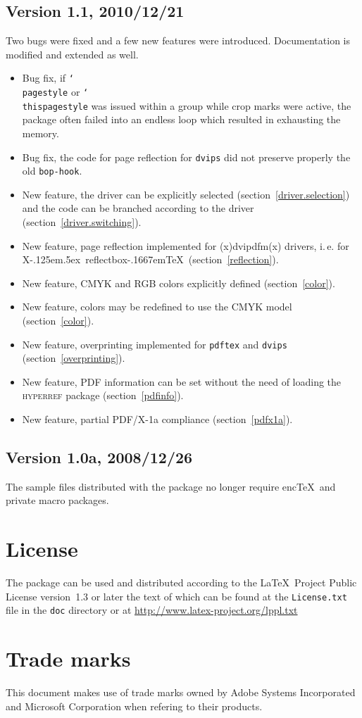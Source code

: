 \documentclass[11pt]{article}
\makeatletter
\let\pkg\textsc
\DeclareRobustCommand\cmd[1]{\texttt{\char`\\#1}}
\def\ie.{i.\,e.\@}
\DeclareRobustCommand\XeTeX{X\kern-.125em\lower.5ex\hbox{\csname
              reflectbox\endcsname{E}}\kern-.1667em\TeX}
\let\zwcomma\,
\def\,{\texorpdfstring{\zwcomma}{}}
\makeatother
\begin{document}
\subsection{Version 1.1, 2010/12/21}
Two bugs were fixed and a few new features were introduced. Documentation is modified and extended as
well.
\begin{itemize}
\item Bug fix, if \cmd{pagestyle} or \cmd{thispagestyle} was issued within a group while crop marks
were active, the package often failed into an endless loop which resulted in exhausting the memory.
\item Bug fix, the code for page reflection for \texttt{dvips} did not preserve properly the old
\texttt{bop-hook}.
\item New feature, the driver can be explicitly selected (section~\ref{driver.selection}) and the
code can be branched according to the driver (section~\ref{driver.switching}).
\item New feature, page reflection implemented for (x)dvipdfm(x) drivers, \ie. for \XeTeX\
(section~\ref{reflection}).
\item New feature, CMYK and RGB colors explicitly defined (section~\ref{color}).
\item New feature, colors may be redefined to use the CMYK model (section~\ref{color}).
\item New feature, overprinting implemented for \texttt{pdftex} and \texttt{dvips}
(section~\ref{overprinting}).
\item New feature, PDF information can be set without the need of loading the \pkg{hyperref}
package (section~\ref{pdfinfo}).
\item New feature, partial PDF/X-1a compliance (section~\ref{pdfx1a}).
\end{itemize}

\subsection{Version 1.0a, 2008/12/26}
The sample files distributed with the package no longer require enc\TeX\ and private macro
packages.

\section{License}
The package can be used and distributed according to the \LaTeX\ Project Public License version~1.3 or later the
text of which can be found at the \texttt{License.txt} file in the \texttt{doc} directory or at
\url{http://www.latex-project.org/lppl.txt}

\section{Trade marks}
This document makes use of trade marks owned by Adobe Systems Incorporated and Microsoft
Corporation when refering to their products.
\end{document}
